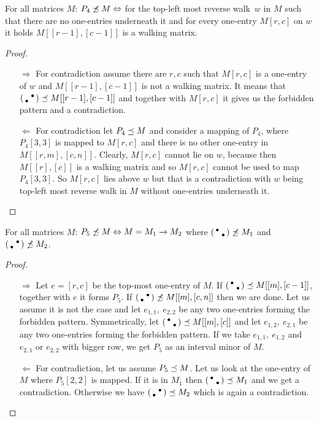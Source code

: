 \begin{thm}
For all matrices $M$: $P_4\not\preceq M\Leftrightarrow$ for the top-left most reverse walk~$w$ in $M$ such that there are no one-entries underneath it and for every one-entry $M[r,c]$ on $w$ it holds $M[[r-1],[c-1]]$ is a walking matrix.
\end{thm}
\begin{proof}
\begin{itemize}
	\item[$\Rightarrow$] For contradiction assume there are $r,c$ such that $M[r,c]$ is a one-entry of $w$ and $M[[r-1],[c-1]]$ is not a walking matrix. It means that $\left(\begin{smallmatrix} &\bullet\\\bullet& \end{smallmatrix}\right)\preceq M[[r-1],[c-1]]$ and together with $M[r,c]$ it gives us the forbidden pattern and a contradiction.
	\item[$\Leftarrow$] For contradiction let $P_4\preceq M$ and consider a mapping of $P_4$, where $P_4[3,3]$ is mapped to $M[r,c]$ and there is no other one-entry in $M[[r,m],[c,n]]$. Clearly, $M[r,c]$ cannot lie on $w$, because then $M[[r],[c]]$ is a walking matrix and so $M[r,c]$ cannot be used to map $P_4[3,3]$. So $M[r,c]$ lies above $w$ but that is a contradiction with $w$ being top-left most reverse walk in $M$ without one-entries underneath it.
\end{itemize}
\end{proof}

\begin{thm}
For all matrices $M$: $P_5\not\preceq M\Leftrightarrow M=M_1\rightarrow M_2$ where $\left(\begin{smallmatrix}\bullet& \\ &\bullet\end{smallmatrix}\right)\not\preceq M_1$ and $\left(\begin{smallmatrix} &\bullet\\\bullet& \end{smallmatrix}\right)\not\preceq M_2$.
\end{thm}
\begin{proof}
\begin{itemize}
	\item[$\Rightarrow$] Let $e=[r,c]$ be the top-most one-entry of $M$. If $\left(\begin{smallmatrix}\bullet& \\ &\bullet\end{smallmatrix}\right)\preceq M[[m],[c-1]]$, together with $e$ it forms $P_5$. If $\left(\begin{smallmatrix} &\bullet\\\bullet& \end{smallmatrix}\right)\not\preceq M[[m],[c,n]]$ then we are done. Let us assume it is not the case and let $e_{1,1},\ e_{2,2}$ be any two one-entries forming the forbidden pattern. Symmetrically, let $\left(\begin{smallmatrix}\bullet& \\ &\bullet\end{smallmatrix}\right)\preceq M[[m],[c]]$ and let $e_{1,2},\ e_{2,1}$ be any two one-entries forming the forbidden pattern. If we take $e_{1,1},\ e_{1,2}$ and $e_{2,1}$ or $e_{2,2}$ with bigger row, we get $P_5$ as an interval minor of $M$. 
	\item[$\Leftarrow$] For contradiction, let us assume $P_5\preceq M$. Let us look at the one-entry of $M$ where $P_5[2,2]$ is mapped. If it is in $M_1$ then $\left(\begin{smallmatrix}\bullet& \\ &\bullet\end{smallmatrix}\right)\preceq M_1$ and we get a contradiction. Otherwise we have $\left(\begin{smallmatrix} &\bullet\\\bullet& \end{smallmatrix}\right)\preceq M_2$ which is again a contradiction.
\end{itemize}
\end{proof}

